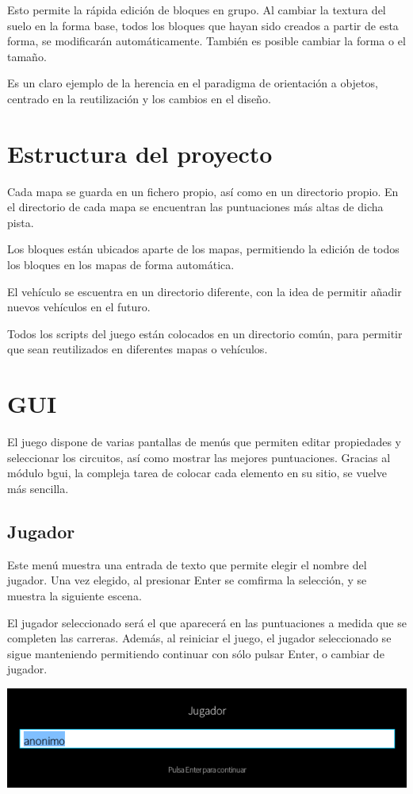 \documentclass[10pt,a4paper,hidelinks]{article}
\begin{document}
Esto permite la rápida edición de bloques en grupo. Al cambiar la textura del 
suelo en la forma base, todos los bloques que hayan sido creados a partir de 
esta forma, se modificarán automáticamente. También es posible cambiar la forma 
o el tamaño.

Es un claro ejemplo de la herencia en el paradigma de orientación a objetos, 
centrado en la reutilización y los cambios en el diseño.

\section{Estructura del proyecto}
Cada mapa se guarda en un fichero propio, así como en un directorio propio. En 
el directorio de cada mapa se encuentran las puntuaciones más altas de dicha 
pista.

Los bloques están ubicados aparte de los mapas, permitiendo la edición de todos 
los bloques en los mapas de forma automática.

El vehículo se escuentra en un directorio diferente, con la idea de permitir 
añadir nuevos vehículos en el futuro.

Todos los scripts del juego están colocados en un directorio común, para 
permitir que sean reutilizados en diferentes mapas o vehículos.

\section{GUI}
El juego dispone de varias pantallas de menús que permiten editar propiedades y 
seleccionar los circuitos, así como mostrar las mejores puntuaciones. Gracias al 
módulo bgui, la compleja tarea de colocar cada elemento en su sitio, se vuelve 
más sencilla.

\subsection{Jugador}
Este menú muestra una entrada de texto que permite elegir el nombre del jugador.  
Una vez elegido, al presionar Enter se comfirma la selección, y se muestra la 
siguiente escena.

El jugador seleccionado será el que aparecerá en las puntuaciones a medida que 
se completen las carreras. Además, al reiniciar el juego, el jugador 
seleccionado se sigue manteniendo permitiendo continuar con sólo pulsar Enter, o 
cambiar de jugador.
\begin{center}
\includegraphics[scale=0.5]{jugador}
\end{center}
\end{document}
